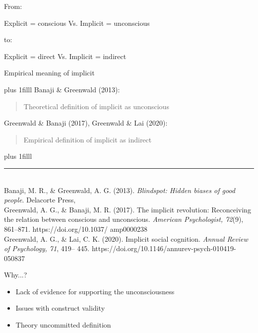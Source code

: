 \documentclass{beamer}
\begin{document}
\begin{frame}
	
	\begin{center}
		From: 
		
		\vspace{5mm}
		Explicit = conscious Vs. Implicit = unconscious 
		
		\vspace{5mm}
		to:
		
		\vspace{5mm}
		Explicit = direct Vs. Implicit = indirect 
	\end{center}
	
	\vspace{5mm}
	Empirical meaning of implicit
\end{frame}

\begin{frame}
	\vskip0pt plus 1filll
	Banaji \& Greenwald (2013): 
	
	\vspace{5mm}
	\begin{quote}
		Theoretical definition of implicit as unconscious
	\end{quote}

\vspace{5mm}
Greenwald \& Banaji (2017), Greenwald \& Lai (2020): 

\vspace{5mm}
\begin{quote}
	Empirical definition of implicit as indirect
\end{quote}
\vskip0pt plus 1filll

\color{template}\rule{0.30\linewidth}{0.5pt}\\
\color{black}
\footnotesize{Banaji, M. R., \& Greenwald, A. G. (2013). \emph{Blindspot:
	Hidden biases of good people}. Delacorte Press,\\ 
Greenwald, A. G., \& Banaji, M. R. (2017). The
implicit revolution: Reconceiving the relation
between conscious and unconscious. \emph{American Psychologist, 72}(9), 861–871. https://doi.org/10.1037/
amp0000238\\
Greenwald, A. G., \& Lai, C. K. (2020). Implicit social
cognition. \emph{Annual Review of Psychology, 71}, 419–
445. https://doi.org/10.1146/annurev-psych-010419-
050837
}
\end{frame}

\begin{frame}{Why...?}
	\begin{itemize}
		\item Lack of evidence for supporting the unconsciousness
		\item Issues with construct validity 
		\item Theory uncommitted definition
	\end{itemize}
\end{frame}
\end{document}
